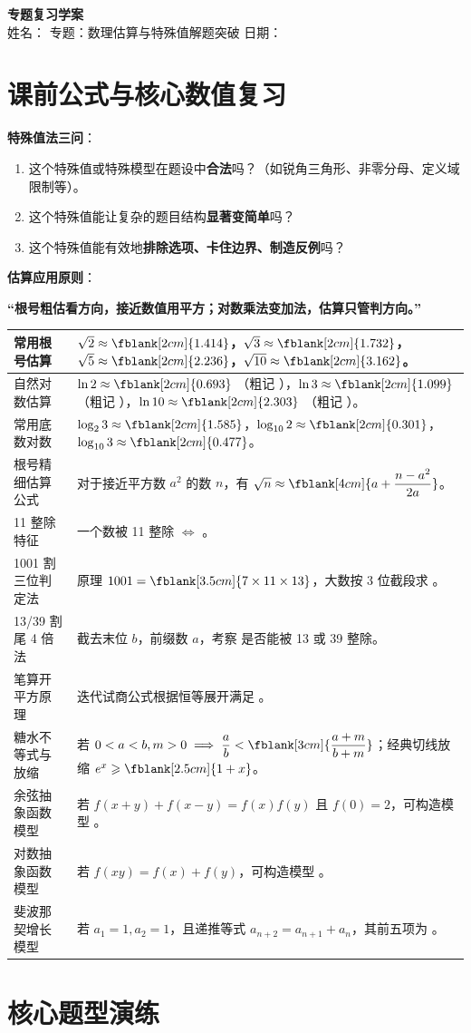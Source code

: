\documentclass[12pt,a4paper]{ctexart}
\newcommand{\formulatable}{%
  \arrayrulecolor{rulecolor}%
  \begin{tabularx}{\textwidth}{p{4.2cm}X}
  \toprule[1.2pt]
  常用根号估算 & \(\sqrt{2} \approx \fblank[2cm]{1.414}\)，\(\sqrt{3} \approx \fblank[2cm]{1.732}\)，\(\sqrt{5} \approx \fblank[2cm]{2.236}\)，\(\sqrt{10} \approx \fblank[2cm]{3.162}\)。\\ \hline
  自然对数估算 & \(\ln 2 \approx \fblank[2cm]{0.693}\) （粗记 \fblank[1.2cm]{0.7}），\(\ln 3 \approx \fblank[2cm]{1.099}\) （粗记 \fblank[1.2cm]{1.1}），\(\ln 10 \approx \fblank[2cm]{2.303}\) （粗记 \fblank[1.2cm]{2.3}）。\\ \hline
  常用底数对数 & \(\log_2 3 \approx \fblank[2cm]{1.585}\)，\(\log_{10} 2 \approx \fblank[2cm]{0.301}\)，\(\log_{10} 3 \approx \fblank[2cm]{0.477}\)。\\ \hline
  根号精细估算公式 & 对于接近平方数 \(a^2\) 的数 \(n\)，有 \(\sqrt{n} \approx \fblank[4cm]{a + \dfrac{n - a^2}{2a}}\)。\\ \hline
  11 整除特征 & 一个数被 11 整除 \(\iff\) \fblank[5cm]{奇数位之和与偶数位之和的差能被 11 整除}。\\ \hline
  1001 割三位判定法 & 原理 \(1001 = \fblank[3.5cm]{7 \times 11 \times 13}\)，大数按 3 位截段求 \fblank[4.5cm]{奇数段之和与偶数段之和的差}。\\ \hline
  13/39 割尾 4 倍法 & 截去末位 \(b\)，前缀数 \(a\)，考察 \fblank[3.5cm]{\(a + 4b\)} 是否能被 13 或 39 整除。\\ \hline
  笔算开平方原理 & 迭代试商公式根据恒等展开满足 \fblank[4.5cm]{\((20a + b)b \leqslant \text{当前余数}\)}。\\ \hline
  糖水不等式与放缩 & 若 \(0<a<b, m>0 \implies \dfrac{a}{b} < \fblank[3cm]{\dfrac{a+m}{b+m}}\)；经典切线放缩 \(e^x \geqslant \fblank[2.5cm]{1+x}\)。\\ \hline
  余弦抽象函数模型 & 若 \(f(x+y)+f(x-y)=f(x)f(y)\) 且 \(f(0)=2\)，可构造模型 \fblank[3cm]{\(f(x) = 2\cos kx\)}。\\ \hline
  对数抽象函数模型 & 若 \(f(xy)=f(x)+f(y)\)，可构造模型 \fblank[3cm]{\(f(x) = \log_k x\)}。\\ \hline
  斐波那契增长模型 & 若 \(a_1=1, a_2=1\)，且递推等式 \(a_{n+2} = a_{n+1} + a_n\)，其前五项为 \fblank[3cm]{1, 1, 2, 3, 5}。\\
  \bottomrule[1.2pt]
  \end{tabularx}%
}
\begin{document}
\begin{center}
  {\Large\bfseries 专题复习学案}\\
  \vspace{0.6em}
  姓名：\blank{3cm}
  \quad
  专题：数理估算与特殊值解题突破
  \quad
  日期：\blank{3cm}
\end{center}

\section{课前公式与核心数值复习}

\begin{tcolorbox}[
  enhanced,
  colback=white,
  colframe=black,
  boxrule=0.8pt,
  arc=0pt,
  left=10pt, right=10pt, top=8pt, bottom=8pt,
  title={\bfseries 【特殊值解题核心扫描】}
]
  \textbf{特殊值法三问}：
  \begin{enumerate}[label=\arabic*. , leftmargin=2em, nosep]
    \item 这个特殊值或特殊模型在题设中\textbf{合法}吗？（如锐角三角形、非零分母、定义域限制等）。
    \item 这个特殊值能让复杂的题目结构\textbf{显著变简单}吗？
    \item 这个特殊值能有效地\textbf{排除选项、卡住边界、制造反例}吗？
  \end{enumerate}
  \vspace{0.4em}
  \textbf{估算应用原则}：
  \begin{center}
    \textbf{“根号粗估看方向，接近数值用平方；对数乘法变加法，估算只管判方向。”}
  \end{center}
\end{tcolorbox}

\vspace{0.8em}
\begingroup
\large
\renewcommand{\arraystretch}{1.5}
\linespread{1.3}\selectfont
\showprompttrue 
\formulatable
\endgroup

\newpage

\section{核心题型演练}

\autoquestion{\qOneStem}
\qOneOptions
\choiceworkarea[3.5cm]
\end{document}
